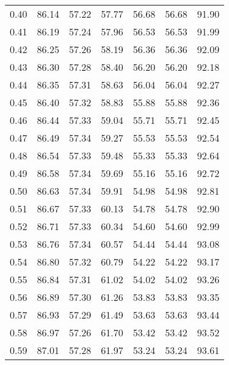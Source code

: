 \begin{tabular}{|c|c|c|c|c|c|c|}
      0.40 &     86.14 &     57.22 &      57.77 &   56.68 &      56.68 &         91.90 \\
      0.41 &     86.19 &     57.24 &      57.96 &   56.53 &      56.53 &         91.99 \\
      0.42 &     86.25 &     57.26 &      58.19 &   56.36 &      56.36 &         92.09 \\
      0.43 &     86.30 &     57.28 &      58.40 &   56.20 &      56.20 &         92.18 \\
      0.44 &     86.35 &     57.31 &      58.63 &   56.04 &      56.04 &         92.27 \\
      0.45 &     86.40 &     57.32 &      58.83 &   55.88 &      55.88 &         92.36 \\
      0.46 &     86.44 &     57.33 &      59.04 &   55.71 &      55.71 &         92.45 \\
      0.47 &     86.49 &     57.34 &      59.27 &   55.53 &      55.53 &         92.54 \\
      0.48 &     86.54 &     57.33 &      59.48 &   55.33 &      55.33 &         92.64 \\
      0.49 &     86.58 &     57.34 &      59.69 &   55.16 &      55.16 &         92.72 \\
      0.50 &     86.63 &     57.34 &      59.91 &   54.98 &      54.98 &         92.81 \\
      0.51 &     86.67 &     57.33 &      60.13 &   54.78 &      54.78 &         92.90 \\
      0.52 &     86.71 &     57.33 &      60.34 &   54.60 &      54.60 &         92.99 \\
      0.53 &     86.76 &     57.34 &      60.57 &   54.44 &      54.44 &         93.08 \\
      0.54 &     86.80 &     57.32 &      60.79 &   54.22 &      54.22 &         93.17 \\
      0.55 &     86.84 &     57.31 &      61.02 &   54.02 &      54.02 &         93.26 \\
      0.56 &     86.89 &     57.30 &      61.26 &   53.83 &      53.83 &         93.35 \\
      0.57 &     86.93 &     57.29 &      61.49 &   53.63 &      53.63 &         93.44 \\
      0.58 &     86.97 &     57.26 &      61.70 &   53.42 &      53.42 &         93.52 \\
      0.59 &     87.01 &     57.28 &      61.97 &   53.24 &      53.24 &         93.61 \\

\end{tabular}
